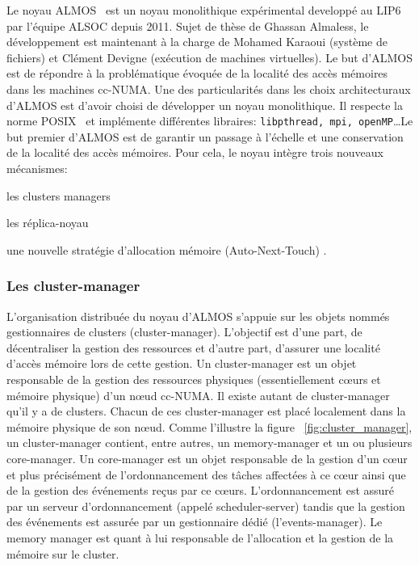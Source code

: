     Le noyau ALMOS~\cite{almaless2011almos} est un noyau monolithique
    expérimental developpé au LIP6 par l'équipe ALSOC depuis 2011. Sujet de
    thèse de Ghassan Almaless, le développement est maintenant à la charge de
    Mohamed Karaoui (système de fichiers) et Clément Devigne (exécution de
    machines virtuelles). Le but d'ALMOS est de répondre à la problématique
    évoquée de la localité des accès mémoires dans les machines cc-NUMA. Une des
    particularités dans les choix architecturaux d'ALMOS est d'avoir choisi de
    développer un noyau monolithique. Il respecte la norme
    POSIX~\cite{posix2013} et implémente différentes libraires:
    \texttt{libpthread, mpi, openMP}\ldots Le but premier d'ALMOS est de
    garantir un passage à l'échelle et une conservation de la localité des accès
    mémoires. Pour cela, le noyau intègre trois nouveaux mécanismes:
    \benumline \item les clusters managers \item les réplica-noyau \item une
    nouvelle stratégie d'allocation mémoire (Auto-Next-Touch) \eenumline.

    
    \subsubsection{Les cluster-manager}

      L'organisation distribuée du noyau d’ALMOS s’appuie sur les objets nommés
      gestionnaires de clusters (cluster-manager). L’objectif est d’une part, de
      décentraliser la gestion des ressources et d’autre part, d’assurer une
      localité d’accès mémoire lors de cette gestion. Un cluster-manager est un
      objet responsable de la gestion des ressources physiques (essentiellement
      c\oe urs et mémoire physique) d’un nœud cc-NUMA. Il existe autant de
      cluster-manager qu’il y a de clusters. Chacun de ces cluster-manager est
      placé localement dans la mémoire physique de son n\oe ud. Comme l'illustre
      la figure ~\ref{fig:cluster_manager}, un cluster-manager contient, entre
      autres, un memory-manager et un ou plusieurs core-manager.  Un
      core-manager est un objet responsable de la gestion d’un c\oe ur et plus
      précisément de l'ordonnancement des tâches affectées à ce c\oe ur ainsi
      que de la gestion des événements reçus par ce c\oe urs. L'ordonnancement
      est assuré par un serveur d'ordonnancement (appelé scheduler-server)
      tandis que la gestion des événements est assurée par un gestionnaire dédié
      (l'events-manager). Le memory manager est quant à lui responsable de
      l'allocation et la gestion de la mémoire sur le cluster.

